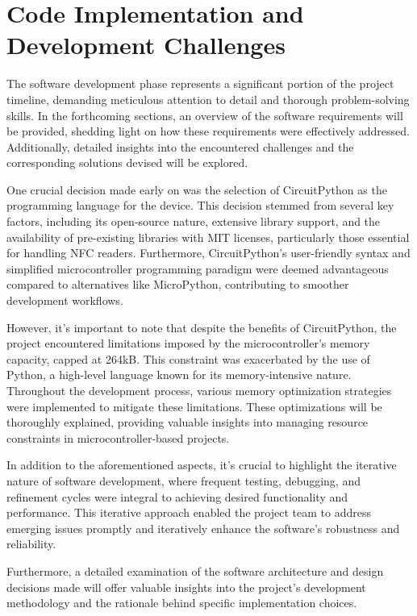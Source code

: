 \chapter{Code Implementation and Development Challenges}
\label{cap:codeAndChallenges}

The software development phase represents a significant portion of the project timeline, demanding 
meticulous attention to detail and thorough problem-solving skills. In the forthcoming sections, 
an overview of the software requirements will be provided, shedding light on how these 
requirements were effectively addressed. Additionally, detailed insights into the encountered 
challenges and the corresponding solutions devised will be explored.

One crucial decision made early on was the selection of CircuitPython as the programming language 
for the device. This decision stemmed from several key factors, including its open-source nature, 
extensive library support, and the availability of pre-existing libraries with MIT licenses, 
particularly those essential for handling NFC readers. Furthermore, CircuitPython's user-friendly 
syntax and simplified microcontroller programming paradigm were deemed advantageous compared to 
alternatives like MicroPython, contributing to smoother development workflows.

However, it's important to note that despite the benefits of CircuitPython, the project encountered 
limitations imposed by the microcontroller's memory capacity, capped at 264kB. This constraint was 
exacerbated by the use of Python, a high-level language known for its memory-intensive nature. 
Throughout the development process, various memory optimization strategies were implemented to 
mitigate these limitations. These optimizations will be thoroughly explained, providing valuable 
insights into managing resource constraints in microcontroller-based projects.

In addition to the aforementioned aspects, it's crucial to highlight the iterative nature of 
software development, where frequent testing, debugging, and refinement cycles were integral to 
achieving desired functionality and performance. This iterative approach enabled the project team 
to address emerging issues promptly and iteratively enhance the software's robustness and 
reliability.

Furthermore, a detailed examination of the software architecture and design decisions made will 
offer valuable insights into the project's development methodology and the rationale behind 
specific implementation choices.

